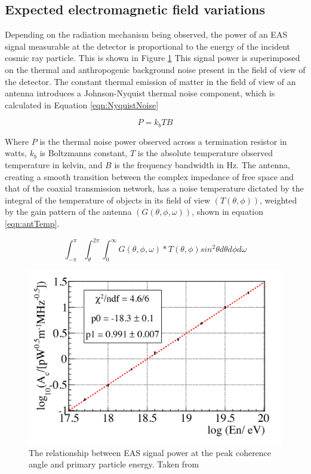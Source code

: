 	\subsection{Expected electromagnetic field variations}
		Depending on the radiation mechanism being observed, the power of an EAS signal measurable at the detector is proportional to the energy of the incident cosmic ray particle.\cite{EnergyEstimator}  This is shown in Figure \ref{fig:EASSignalPower} This signal power is superimposed on the thermal and anthropogenic background noise present in the field of view of the detector.  The constant thermal emission of matter in the field of view of an antenna introduces a Johnson-Nyquist thermal noise component, which is calculated in Equation \ref{eqn:NyquistNoise}

\begin{equation}
	\label{eqn:NyquistNoise}
	P = k_{b}TB
\end{equation}

Where $P$ is the thermal noise power observed across a termination resistor in watts, $k_{b}$ is Boltzmanns constant, $T$ is the absolute temperature observed temperature in kelvin, and $B$ is the frequency bandwidth in Hz.  The antenna, creating a smooth transition between the complex impedance of free space and that of the coaxial transmission network, has a noise temperature dictated by the integral of the temperature of objects in its field of view $(T(\theta,\phi))$, weighted by the gain pattern of the antenna $(G(\theta,\phi,\omega))$, shown in equation \ref{eqn:antTemp}.

\begin{equation}
	\label{eqn:antTemp}
	\int_{-\pi}^{\pi}\int_{\theta}^{2\pi}\int_{0}^{\infty} G(\theta,\phi,\omega)*T(\theta,\phi)sin^{2}\theta d\theta d\phi d\omega
\end{equation}


\begin{figure}
\centering
	\includegraphics[width=\textwidth]{figures/EASSignalPower}
	\caption{The relationship between EAS signal power at the peak coherence angle and primary particle energy.  Taken from \cite{EnergyEstimator}}
	\label{fig:EASSignalPower}
\end{figure}

